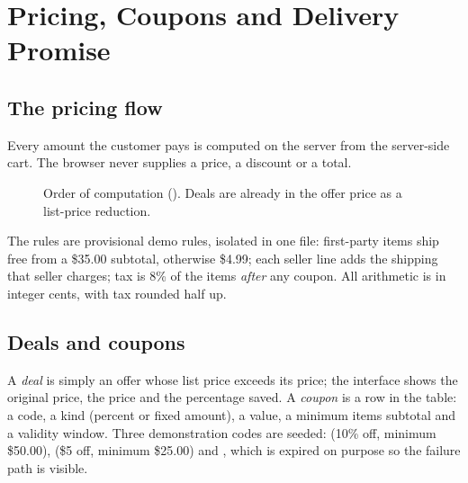 \chapter{Pricing, Coupons and Delivery Promise}
\label{ch:commerce}

\section{The pricing flow}

Every amount the customer pays is computed on the server from the server-side cart. The browser never supplies a price, a discount or a total.

\begin{figure}[H]
\centering
{}
\caption{Order of computation (). Deals are already in the offer price as a list-price reduction.}
\label{fig:pricing}
\end{figure}

The rules are provisional demo rules, isolated in one file: first-party items ship free from a \$35.00 subtotal, otherwise \$4.99; each seller line adds the shipping that seller charges; tax is 8\% of the items \emph{after} any coupon. All arithmetic is in integer cents, with tax rounded half up. \tagimpl{} \tagtest{}

\section{Deals and coupons}

A \emph{deal} is simply an offer whose list price exceeds its price; the interface shows the original price, the price and the percentage saved. A \emph{coupon} is a row in the  table: a code, a kind (percent or fixed amount), a value, a minimum items subtotal and a validity window. Three demonstration codes are seeded:  (10\% off, minimum \$50.00),  (\$5 off, minimum \$25.00) and , which is expired on purpose so the failure path is visible.

